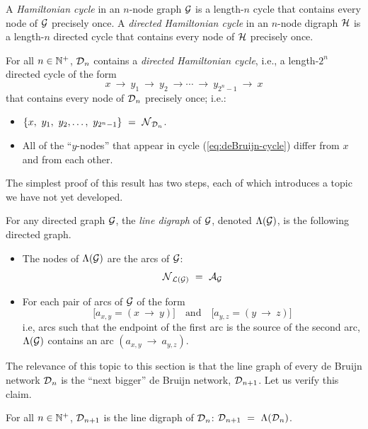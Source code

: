 A {\it Hamiltonian cycle} in an $n$-node graph $\mbox{$\cal G$}$ is a length-$n$
cycle that contains every node of $\mbox{$\cal G$}$ precisely once.  A {\it
  directed Hamiltonian cycle} in an $n$-node digraph $\mbox{$\cal H$}$ is a
length-$n$ directed cycle that contains every node of $\mbox{$\cal H$}$ precisely
once.

\begin{prop}
\label{thm:deBruijn-Hamiltonian}
For all $n \in \mathbb{N}^+$, $\mbox{$\cal D$}_n$ contains a {\em directed Hamiltonian
  cycle}, 
i.e., a length-$2^n$ directed cycle of the form
\begin{equation}
\label{eq:deBruijn-cycle}
 x \ \rightarrow \ y_1 \ \rightarrow \ y_2 \ \rightarrow \cdots
\ \rightarrow \ y_{2^n-1} \ \rightarrow \ x
\end{equation}
that contains every node of $\mbox{$\cal D$}_n$ precisely once; i.e.:
\begin{itemize}
\item
$\{x, \ y_1, \ y_2, \ldots, \ y_{2^n-1}\} \ = \ \n_{\fd_n}$.
\item
All of the ``$y$-nodes'' that appear in cycle
(\ref{eq:deBruijn-cycle}) differ from $x$ and from each other.
\end{itemize}
\end{prop}

The simplest proof of this result has two steps, each of which
introduces a topic we have not yet developed.

\medskip

%
For any directed graph $\mbox{$\cal G$}$, the {\it line digraph} 
 of $\mbox{$\cal G$}$, denoted $\Lambda(\mbox{$\cal G$})$, is the following
directed graph.
\begin{itemize}
\item
The nodes of $\Lambda(\mbox{$\cal G$})$ are the arcs of $\mbox{$\cal G$}$:
\[ \n_{{\cal L}({\cal G})} \ = \ \a_{\fg} \]
\item
For each pair of arcs of $\mbox{$\cal G$}$ of the form
\[ \big[a_{x,y} = (x \ \rightarrow \ y) \big] \ \ \ \mbox{ and } \ \ \ 
\big[a_{y,z} = (y \ \rightarrow \ z) \big]
\]
i.e, arcs such that the endpoint of the first arc is the source of the
second arc, $\Lambda(\mbox{$\cal G$})$ contains an arc $(a_{x,y} \ \rightarrow
\ a_{y,z})$.
\end{itemize}
The relevance of this topic to this section is that the line graph of
every de Bruijn network $\mbox{$\cal D$}_n$ is the ``next bigger'' de Bruijn
network, $\mbox{$\cal D$}_{n+1}$.  Let us verify this claim.

\begin{prop}
\label{thm:deBruin-linegraph}
For all $n \in \mathbb{N}^+$,
$\mbox{$\cal D$}_{n+1}$ is the line digraph of $\mbox{$\cal D$}_n$: $\d_{n+1} \ = \ \Lambda(\d_n)$.
\end{prop}

